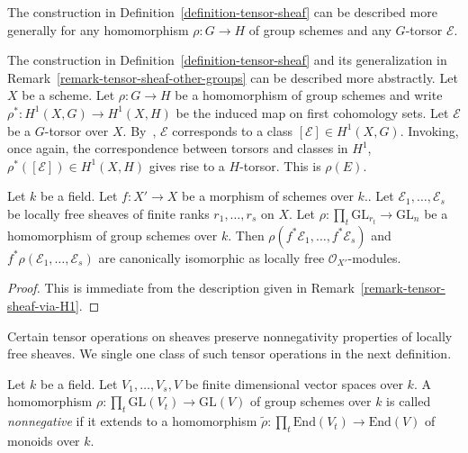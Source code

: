 \begin{remark}
\label{remark-tensor-sheaf-other-groups}
The construction in Definition~\ref{definition-tensor-sheaf} can be described
more generally for any homomorphism $\rho : G \to H$ of group schemes
and any $G$-torsor $\mathcal{E}$.
\end{remark}

\begin{remark}
\label{remark-tensor-sheaf-via-H1}
The construction in Definition~\ref{definition-tensor-sheaf} and its
generalization in Remark~\ref{remark-tensor-sheaf-other-groups} can be described
more abstractly.
Let $X$ be a scheme.
Let $\rho : G \to H$ be a homomorphism of group schemes
and write $\rho^* : H^1(X,G) \to H^1(X,H)$ be the induced map on first
cohomology sets.
Let $\mathcal{E}$ be a $G$-torsor over $X$.
By~, $\mathcal{E}$ corresponds to a class $[\mathcal{E}] \in H^1(X,G)$.
Invoking, once again, the correspondence between torsors and classes in $H^1$,
$\rho^*([\mathcal{E}]) \in H^1(X,H)$ gives rise to a $H$-torsor.
This is $\rho(E)$.
\end{remark}

\begin{lemma}
\label{lemma-pullback-tensor-sheaves}
Let $k$ be a field.
Let $f: X' \to X$ be a morphism of schemes over $k$..
Let $\mathcal{E}_1,\ldots,\mathcal{E}_s$ be locally free sheaves of finite
ranks $r_1,\ldots,r_s$ on $X$.
Let $\rho : \prod_t \mathrm{GL}_{r_t} \to \mathrm{GL}_n$ be a homomorphism of
group schemes over $k$.
Then $\rho(f^*\mathcal{E}_1,\ldots,f^*\mathcal{E}_s)$ and
$f^*\rho(\mathcal{E}_1,\ldots,\mathcal{E}_s)$ are canonically isomorphic as
locally free $\mathcal{O}_{X'}$-modules.
\end{lemma}

\begin{proof}
This is immediate from the description given in
Remark~\ref{remark-tensor-sheaf-via-H1}.
\end{proof}

Certain tensor operations on sheaves preserve nonnegativity properties of
locally free sheaves.
We single one class of such tensor operations in the next definition.

\begin{definition}
\label{definition-nonneg-rep}
Let $k$ be a field.
Let $V_1,\ldots,V_s,V$ be finite dimensional vector spaces over $k$.
A homomorphism $\rho : \prod_t \mathrm{GL}(V_t) \to \mathrm{GL}(V)$ of group
schemes over $k$ is called \textit{nonnegative} if it extends to a homomorphism
$\tilde{\rho} : \prod_t \mathrm{End}(V_t) \to \mathrm{End}(V)$ of monoids
over $k$.
\end{definition}

